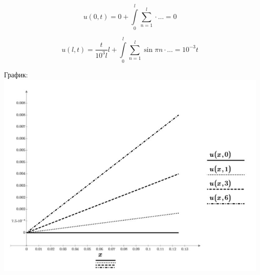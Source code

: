 $$ u(0, t) = 0 + \int\limits_0^l \sum_{n=1}^{l} \cdot \ldots = 0$$

$$ u(l, t) = \dfrac{t}{10^{3}l}l + \int\limits_0^l \sum_{n=1}^{l} \sin{\pi n} \cdot \ldots = 10^{-3}t$$

График:\\
\includegraphics[width=0.8\linewidth]{2.jpg}

\pagebreak